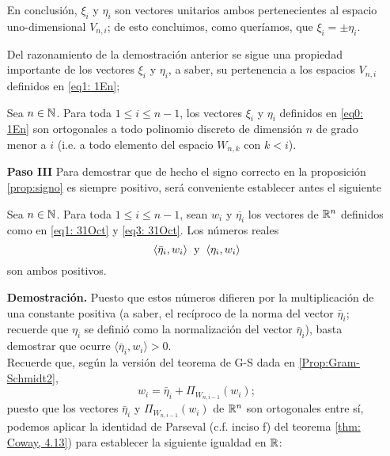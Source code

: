 \begin{itemize}
En conclusión, $\xi_{i}$ y $\eta_{i}$ 
son vectores unitarios ambos pertenecientes al espacio
uno-dimensional $V_{n,i}$; de esto concluimos, como
queríamos, que $\xi_{i} = \pm \eta_{i} $. \QEDB
\vspace{0.2cm}


Del razonamiento de la demostración anterior se sigue una propiedad
importante de los vectores $\xi_{i}$ y $\eta_{i}$,
a saber, su pertenencia a los espacios $V_{n,i}$
definidos en \eqref{eq1: 1En};

\begin{cor} \label{cor: xi y eta ortogonales a elementos de...}
Sea $n \in \mathbb{N}$.
Para toda $1 \leq i \leq n-1$, los vectores 
$\xi_{i}$ y $\eta_{i}$ definidos en \eqref{eq0: 1En}
son ortogonales a todo polinomio
discreto de dimensión $n$ 
de grado menor a $i$ (i.e. a todo elemento
del espacio $W_{n,k}$ con $k < i$).
\end{cor}




\item[\textbf{Paso III}] Para demostrar que de hecho 
el signo correcto en la
proposición \ref{prop:signo} es siempre positivo, 
será conveniente
establecer antes el siguiente

\begin{lema} \label{Lema1}
Sea $n \in \mathbb{N}$. 
Para toda
$1 \leq i \leq n-1$, 
sean $w_{i}$ y $\overline{\eta_{i}}$ los vectores
de $\mathbb{R}^{n}$ definidos como en 
\eqref{eq1: 31Oct} y
\eqref{eq3: 31Oct}.
Los números reales
\[
\langle \bar{\eta}_{i} , w_{i} \rangle \hspace{0.2cm}
\text{y} \hspace{0.2cm} \langle \eta_{i} , w_{i} \rangle 
\]
son ambos positivos.
\end{lema}
\noindent
\textbf{Demostración.}
Puesto que estos números difieren por la multiplicación
de una constante positiva
(a saber, el recíproco de la norma
del vector $\bar{\eta}_{i}$;
recuerde que $\eta_{i}$
se definió como la normalización
del vector $\bar{\eta}_{i}$), basta demostrar que 
ocurre $\langle\bar{\eta}_{i}, w_{i} \rangle >0$. \\
Recuerde que, según la versión del 
teorema de G-S dada en \ref{Prop:Gram-Schmidt2},
\[
w_{i}= \bar{\eta}_{i} + \Pi_{W_{n,i-1}}(w_{i});
\]
puesto que los vectores $\bar{\eta}_{i}$
y $\Pi_{W_{n,i-1}}(w_{i})$ de $\mathbb{R}^{n}$  son ortogonales entre sí, 
podemos
aplicar la identidad de Parseval (c.f. 
inciso f) del teorema 
\ref{thm: Coway, 4.13})
para establecer la siguiente igualdad en $\mathbb{R}$:


\end{itemize}
